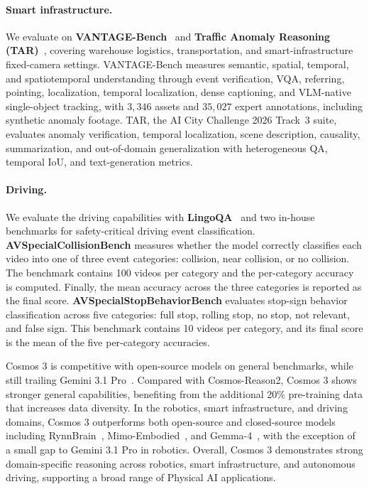 \paragraph{Smart infrastructure.} We evaluate on \textbf{VANTAGE-Bench}~\citep{nvidia2026vantage} and \textbf{Traffic Anomaly Reasoning (TAR)}~\citep{nvidia2026tar}, covering warehouse logistics, transportation, and smart-infrastructure fixed-camera settings. VANTAGE-Bench measures semantic, spatial, temporal, and spatiotemporal understanding through event verification, VQA, referring, pointing, localization, temporal localization, dense captioning, and VLM-native single-object tracking, with $3{,}346$ assets and $35{,}027$ expert annotations, including synthetic anomaly footage. TAR, the AI City Challenge 2026 Track~3 suite, evaluates anomaly verification, temporal localization, scene description, causality, summarization, and out-of-domain generalization with heterogeneous QA, temporal IoU, and text-generation metrics.

\paragraph{Driving.} We evaluate the driving capabilities with \textbf{LingoQA}~\citep{marcu2024lingoqa} and two in-house benchmarks for safety-critical driving event classification. \textbf{AVSpecialCollisionBench} measures whether the model correctly classifies each video into one of three event categories: collision, near collision, or no collision. The benchmark contains 100 videos per category and the per-category accuracy is computed. Finally, the mean accuracy across the three categories is reported as the final score. \textbf{AVSpecialStopBehaviorBench} evaluates stop-sign behavior classification across five categories: full stop, rolling stop, no stop, not relevant, and false sign. This benchmark contains 10 videos per category, and its final score is the mean of the five per-category accuracies.

Cosmos 3 is competitive with open-source models on general benchmarks, while still trailing Gemini 3.1 Pro~\citep{gemini3}. Compared with Cosmos-Reason2, Cosmos 3 shows stronger general capabilities, benefiting from the additional 20\% pre-training data that increases data diversity. In the robotics, smart infrastructure, and driving domains, Cosmos 3 outperforms both open-source and closed-source models including RynnBrain~\citep{dang2026rynnbrain}, Mimo-Embodied~\citep{hao2025mimo}, and Gemma-4~\citep{gemma4modelcard}, with the exception of a small gap to Gemini 3.1 Pro in robotics. Overall, Cosmos 3 demonstrates strong domain-specific reasoning across robotics, smart infrastructure, and autonomous driving, supporting a broad range of Physical AI applications.
